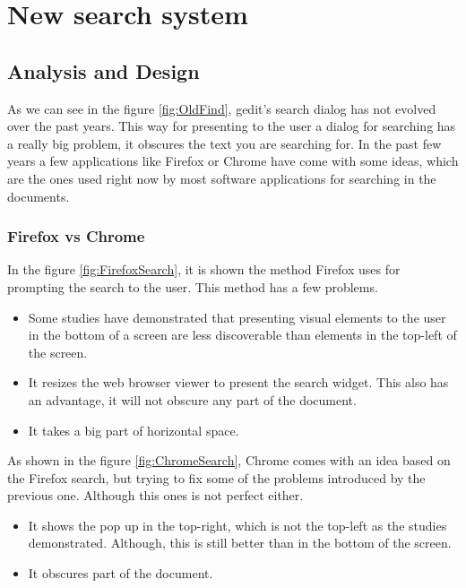
\chapter{New search system}

\section{Analysis and Design}


As we can see in the figure \ref{fig:OldFind}, gedit's search dialog has not evolved over the past years. This way for presenting to the user a dialog for searching has a really big problem, it obscures the text you are searching for. In the past few years a few applications like Firefox or Chrome have come with some ideas, which are the ones used right now by most software applications for searching in the documents.

\newpage
\subsection{Firefox vs Chrome}

In the figure \ref{fig:FirefoxSearch}, it is shown the method Firefox uses for prompting the search to the user. This method has a few problems.
\begin{itemize}
  \item Some studies have demonstrated that presenting visual elements to the user in the bottom of a screen are less discoverable than elements in the top-left of the screen.
  \item It resizes the web browser viewer to present the search widget. This also has an advantage, it will not obscure any part of the document.
  \item It takes a big part of horizontal space.
\end{itemize}


As shown in the figure \ref{fig:ChromeSearch}, Chrome comes with an idea based on the Firefox search, but trying to fix some of the problems introduced by the previous one. Although this ones is not perfect either.
\begin{itemize}
  \item It shows the pop up in the top-right, which is not the top-left as the studies demonstrated. Although, this is still better than in the bottom of the screen.
  \item It obscures part of the document.
\end{itemize}

